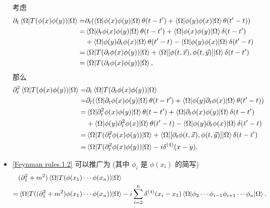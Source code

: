 \begin{itemize}
	\begin{tcolorbox}[title=proof:]
		考虑
		\begin{align}
			\partial_t \braket{\Omega | T(\phi(x) \phi(y)) | \Omega} =& \partial_t (\braket{\Omega | \phi(x) \phi(y) | \Omega} \theta(t - t') + \braket{\Omega | \phi(y) \phi(x) | \Omega} \theta(t' - t)) \notag \\
			=& \braket{\Omega | \partial_t \phi(x) \phi(y) | \Omega} \theta(t - t') + \braket{\Omega | \phi(x) \phi(y) | \Omega} \delta(t - t') \notag \\
			& + \braket{\Omega | \phi(y) \partial_t \phi(x) | \Omega} \theta(t' - t) - \braket{\Omega | \phi(y) \phi(x) | \Omega} \delta(t' - t) \notag \\
			=& \braket{\Omega | T (\partial_t \phi(x) \phi(y)) | \Omega} + \braket{\Omega | [\phi(t, \vec{x}), \phi(t, \vec{y})] | \Omega} \delta(t - t') \notag \\
			=& \braket{\Omega | T (\partial_t \phi(x) \phi(y)) | \Omega},
		\end{align}
		那么
		\begin{align}
			\partial_t^2 \braket{\Omega | T(\phi(x) \phi(y)) | \Omega} =& \partial_t \braket{\Omega | T (\partial_t \phi(x) \phi(y)) | \Omega} \notag \\
			=& \partial_t (\braket{\Omega | \partial_t \phi(x) \phi(y) | \Omega} \theta(t - t') + \braket{\Omega | \phi(y) \partial_t \phi(x) | \Omega} \theta(t' - t)) \notag \\
			=& \braket{\Omega | \partial_t^2 \phi(x) \phi(y) | \Omega} \theta(t - t') + \braket{\Omega | \partial_t \phi(x) \phi(y) | \Omega} \delta(t - t') \notag \\
			& + \braket{\Omega | \phi(y) \partial_t^2 \phi(x) | \Omega} \theta(t' - t) - \braket{\Omega | \phi(y) \partial_t \phi(x) | \Omega} \delta(t' - t) \notag \\
			=& \braket{\Omega | T (\partial_t^2 \phi(x) \phi(y)) | \Omega} + \braket{\Omega | [\partial_t \phi(t, \vec{x}), \phi(t, \vec{y})] | \Omega} \delta(t - t') \notag \\
			=& \braket{\Omega | T (\partial_t^2 \phi(x) \phi(y)) | \Omega} - i \delta^{(4)}(x - y).
		\end{align}
	\end{tcolorbox}
	
	\item \eqref{Feynman rules.1.2} 可以推广为 (其中 $\phi_i$ 是 $\phi(x_i)$ 的简写)
	\begin{align}
		& (\partial_1^2 + m^2) \braket{\Omega | T(\phi(x_1) \cdots \phi(x_n)) | \Omega} \notag \\
		=& \braket{\Omega | T((\partial_1^2 + m^2) \phi(x_1) \cdots \phi(x_n)) | \Omega} - i \sum_{i = 2}^n \delta^{(4)}(x_i - x_1) \braket{\Omega | \phi_2 \cdots \phi_{i - 1} \phi_{i + 1} \cdots \phi_n | \Omega}. \label{Feynman rules.1.5}
	\end{align}
	

\end{itemize}
